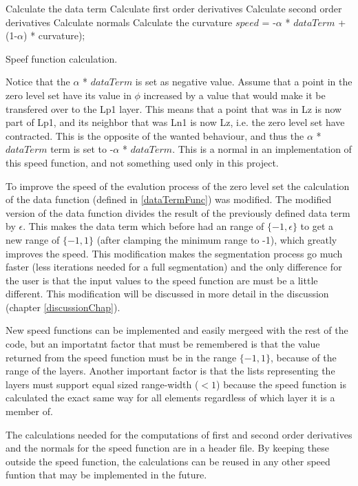 \begin{algorithm}[h!]
\begin{algorithmic}[1]
\State Calculate the data term
\State Calculate first order derivatives
\State Calculate second order derivatives
\State Calculate normals
\State Calculate the curvature 
\State $speed$ = -$\alpha$ * $dataTerm$ + (1-$\alpha$) * curvature);
\EndProcedure
\end{algorithmic}
\caption{Speef function calculation.}
\label{implSpeedAlg}
\end{algorithm}
Notice that the $\alpha$ * $dataTerm$ is set as negative value. Assume that a point in the zero level set have its value in $\phi$ increased by a value that would make it be transfered over to the Lp1 layer. This means that a point that was in Lz is now part of Lp1, and its neighbor that was Ln1 is now Lz, i.e. the zero level set have contracted. This is the opposite of the wanted behaviour, and thus the $\alpha$ * $dataTerm$ term is set to -$\alpha$ * $dataTerm$. This is a normal in an implementation of this speed function, and not something used only in this project.

To improve the speed of the evalution process of the zero level set the calculation of the data function (defined in \ref{dataTermFunc}) was modified. The modified version of the data function divides the result of the previously defined data term by $\epsilon$. This makes the data term which before had an range of $\{-1, \epsilon\}$ to get a new range of $\{-1, 1\}$ (after clamping the minimum range to -1), which greatly improves the speed. This modification makes the segmentation process go much faster (less iterations needed for a full segmentation) and the only difference for the user is that the input values to the speed function are must be a little different. This modification will be discussed in more detail in the discussion (chapter \ref{discussionChap}).

New speed functions can be implemented and easily mergeed with the rest of the code, but an importatnt factor that must be remembered is that the value returned from the speed function must be in the range $\{-1,1\}$, because of the range of the layers. Another important factor is that the lists representing the layers must support equal sized range-width ($<1$) because the speed function is calculated the exact same way for all elements regardless of which layer it is a member of. 

The calculations needed for the computations of first and second order derivatives and the normals for the speed function are in a header file. By keeping these outside the speed function, the calculations can be reused in any other speed funtion that may be implemented in the future. 

